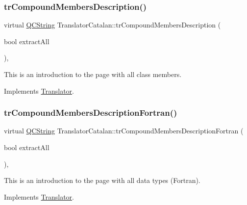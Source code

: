 \subsubsection{\texorpdfstring{trCompoundMembersDescription()}{trCompoundMembersDescription()}}
{\footnotesize\ttfamily virtual \mbox{\hyperlink{class_q_c_string}{Q\+C\+String}} Translator\+Catalan\+::tr\+Compound\+Members\+Description (\begin{DoxyParamCaption}\item[{bool}]{extract\+All }\end{DoxyParamCaption})\hspace{0.3cm}{\ttfamily [inline]}, {\ttfamily [virtual]}}

This is an introduction to the page with all class members. 

Implements \mbox{\hyperlink{class_translator}{Translator}}.

\mbox{\label{class_translator_catalan_a2d72f4a86ab4f9344ea3643a92cd0ffa}} 
\subsubsection{\texorpdfstring{trCompoundMembersDescriptionFortran()}{trCompoundMembersDescriptionFortran()}}
{\footnotesize\ttfamily virtual \mbox{\hyperlink{class_q_c_string}{Q\+C\+String}} Translator\+Catalan\+::tr\+Compound\+Members\+Description\+Fortran (\begin{DoxyParamCaption}\item[{bool}]{extract\+All }\end{DoxyParamCaption})\hspace{0.3cm}{\ttfamily [inline]}, {\ttfamily [virtual]}}

This is an introduction to the page with all data types (Fortran). 

Implements \mbox{\hyperlink{class_translator}{Translator}}.

\mbox{\label{class_translator_catalan_ab76b935112098e36a4441d267ea66e1b}} 
